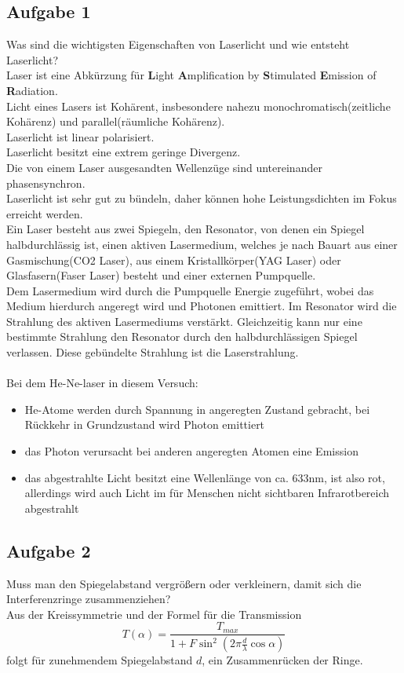 \documentclass[a4paper,10pt]{scrartcl}
\begin{document}
	\subsection{Aufgabe 1}
	Was sind die wichtigsten Eigenschaften von Laserlicht und wie entsteht Laserlicht? \\
	Laser ist eine Abkürzung für \textbf Light \textbf Amplification by \textbf Stimulated \textbf Emission of \textbf Radiation.\\
	Licht eines Lasers ist Kohärent, insbesondere nahezu monochromatisch(zeitliche Kohärenz) und parallel(räumliche Kohärenz).\\
	Laserlicht ist linear polarisiert.\\
	Laserlicht besitzt eine extrem geringe Divergenz.\\
	Die von einem Laser ausgesandten Wellenzüge sind untereinander phasensynchron.\\
	Laserlicht ist sehr gut zu bündeln, daher können hohe Leistungsdichten im Fokus erreicht werden.\\
	Ein Laser besteht aus zwei Spiegeln, den Resonator, von denen ein Spiegel halbdurchlässig ist, einen aktiven Lasermedium, welches je nach Bauart aus einer Gasmischung(CO2 Laser), aus einem Kristallkörper(YAG Laser) oder Glasfasern(Faser Laser) besteht und einer externen Pumpquelle.\\
	Dem Lasermedium wird durch die Pumpquelle Energie zugeführt, wobei das Medium hierdurch angeregt wird und Photonen emittiert. Im Resonator wird die Strahlung des aktiven Lasermediums verstärkt. Gleichzeitig kann nur eine bestimmte Strahlung den Resonator durch den halbdurchlässigen Spiegel verlassen. Diese gebündelte Strahlung ist die Laserstrahlung.\\
	\\
	Bei dem He-Ne-laser in diesem Versuch:\\
	\begin{itemize}
		\item He-Atome werden durch Spannung in angeregten Zustand gebracht, bei Rückkehr in Grundzustand wird Photon emittiert
		\item das Photon verursacht bei anderen angeregten Atomen eine Emission
		\item das abgestrahlte Licht besitzt eine Wellenlänge von ca. 633nm, ist also rot, allerdings wird auch Licht im für Menschen nicht sichtbaren Infrarotbereich abgestrahlt
	\end{itemize}
	\subsection{Aufgabe 2}
	Muss man den Spiegelabstand vergrößern oder verkleinern, damit sich die Interferenzringe
	zusammenziehen?\\
	Aus der Kreissymmetrie und der Formel für die Transmission
	\[
	T(\alpha)=\frac{T_{max}}{1+F\sin^{2}(2 \pi\frac{d}{\lambda}\cos\alpha)}
	\]
	folgt für zunehmendem Spiegelabstand $d$, ein Zusammenrücken der Ringe.\\
\end{document}
